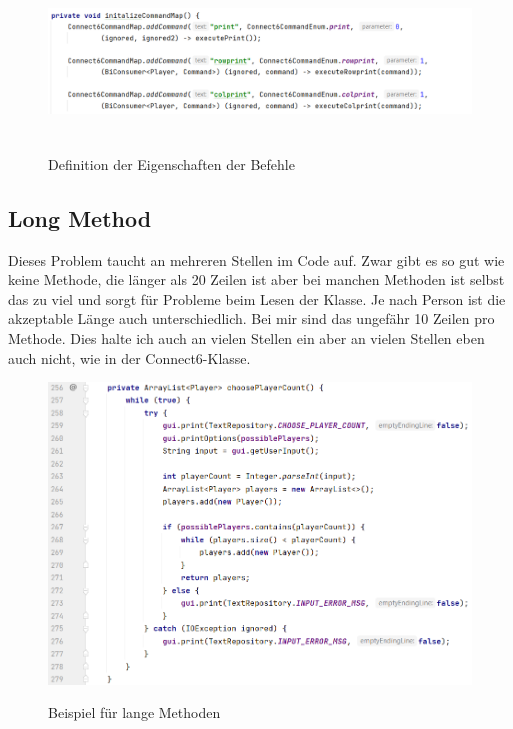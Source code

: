 \documentclass[12pt]{article}
\begin{document}
\begin{figure}[H]
\centering
{\includegraphics[height=4cm]{Bilder/CmdMap}}
\caption{Definition der Eigenschaften der Befehle}
\label{fig:CmdMap}
\end{figure}



\subsection{Long Method}
Dieses Problem taucht an mehreren Stellen im Code auf. Zwar gibt es so gut wie keine Methode, die länger als 20 Zeilen ist aber bei manchen Methoden ist selbst das zu viel und sorgt für Probleme beim Lesen der Klasse. Je nach Person ist die akzeptable Länge auch unterschiedlich. Bei mir sind das ungefähr 10 Zeilen pro Methode. Dies halte ich auch an vielen Stellen ein aber an vielen Stellen eben auch nicht, wie in der Connect6-Klasse.

\begin{figure}[H]
\centering
{\includegraphics[width=15cm]{Bilder/longMethod}}
\caption{Beispiel für lange Methoden}
\label{fig:CmdMap}
\end{figure}
\end{document}
